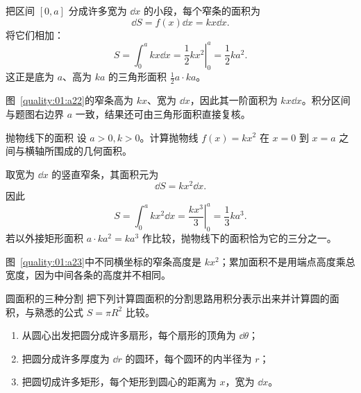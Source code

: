 {\begin{xesolution}
把区间 $[0,a]$ 分成许多宽为 $\dd x$ 的小段，每个窄条的面积为
\[
 \dd S=f(x)\dd x=kx\dd x.
\]
将它们相加：
\[
 S=\int_0^a kx\dd x
 =\left.\frac12kx^2\right|_0^a
 =\boxed{\frac12ka^2}.
\]
这正是底为 $a$、高为 $ka$ 的三角形面积 $\frac12a\cdot ka$。


图~\ref{quality:01:a22}的窄条高为 $kx$、宽为 $\dd x$，因此其一阶面积为 $kx\dd x$。积分区间与题图右边界 $a$ 一致，结果还可由三角形面积直接复核。
\end{xesolution}

\begin{origexamplebox}{抛物线下的面积}\label{ch01:ex:s15-1-18}
设 $a>0,k>0$。计算抛物线 $f(x)=kx^2$ 在 $x=0$ 到 $x=a$ 之间与横轴所围成的几何面积。
\end{origexamplebox}

\begin{xesolution}
取宽为 $\dd x$ 的竖直窄条，其面积元为
\[
 \dd S=kx^2\dd x.
\]
因此
\[
 S=\int_0^a kx^2\dd x
 =\left.\frac{kx^3}{3}\right|_0^a
 =\boxed{\frac13ka^3}.
\]
若以外接矩形面积 $a\cdot ka^2=ka^3$ 作比较，抛物线下的面积恰为它的三分之一。


图~\ref{quality:01:a23}中不同横坐标的窄条高度是 $kx^2$；累加面积不是用端点高度乘总宽度，因为中间各条的高度并不相同。
\end{xesolution}

\begin{origexamplebox}{圆面积的三种分割}\label{ch01:ex:s15-1-19}
把下列计算圆面积的分割思路用积分表示出来并计算圆的面积，与熟悉的公式
$S=\pi R^2$ 比较。
\begin{enumerate}[label=(\alph*),leftmargin=2.2em]
 \item 从圆心出发把圆分成许多扇形，每个扇形的顶角为 $\dd\theta$；
 \item 把圆分成许多厚度为 $\dd r$ 的圆环，每个圆环的内半径为 $r$；
 \item 把圆切成许多矩形，每个矩形到圆心的距离为 $x$，宽为 $\dd x$。
\end{enumerate}
\end{origexamplebox}

}

